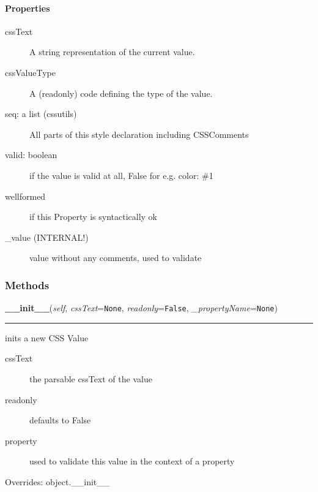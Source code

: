 \paragraph*{Properties}
\label{properties}
\begin{description}
\item[{cssText}] \leavevmode 
A string representation of the current value.

\item[{cssValueType}] \leavevmode 
A (readonly) code defining the type of the value.

\item[{seq: a list (cssutils)}] \leavevmode 
All parts of this style declaration including CSSComments

\item[{valid: boolean}] \leavevmode 
if the value is valid at all, False for e.g. color: {\#}1

\item[{wellformed}] \leavevmode 
if this Property is syntactically ok

\item[{{\_}value (INTERNAL!)}] \leavevmode 
value without any comments, used to validate

\end{description}


  \subsubsection{Methods}

    \vspace{0.5ex}

\hspace{.8\funcindent}\begin{boxedminipage}{\funcwidth}

    \raggedright \textbf{\_\_init\_\_}(\textit{self}, \textit{cssText}={\tt None}, \textit{readonly}={\tt False}, \textit{\_propertyName}={\tt None})

    \vspace{-1.5ex}

    \rule{\textwidth}{0.5\fboxrule}
\setlength{\parskip}{2ex}

inits a new CSS Value
\begin{description}
\item[{cssText}] \leavevmode 
the parsable cssText of the value

\item[{readonly}] \leavevmode 
defaults to False

\item[{property}] \leavevmode 
used to validate this value in the context of a property

\end{description}
\setlength{\parskip}{1ex}
      Overrides: object.\_\_init\_\_

    \end{boxedminipage}

